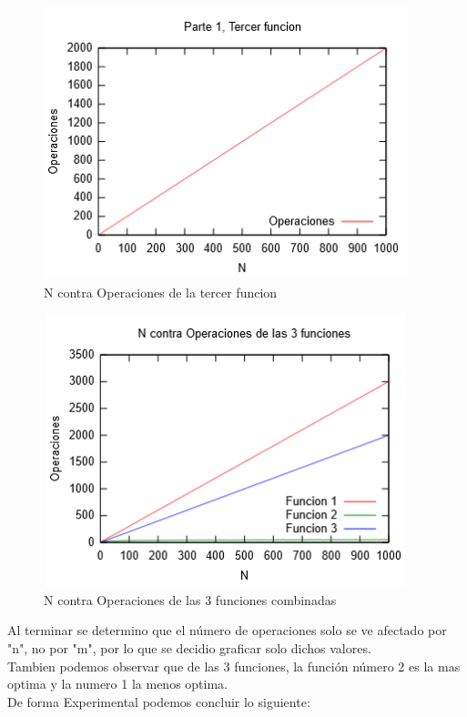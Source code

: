 \documentclass[spanish]{article}
\begin{document}
			\begin{figure}[H]
				\centering
				\includegraphics[width=400px,height=300px]{grafica3}
				\caption{N contra Operaciones de la tercer funcion}
			\end{figure}
			\begin{figure}[H]
				\centering
				\includegraphics[width=400px,height=300px]{grafica4}
				\caption{N contra Operaciones de las 3 funciones combinadas}
			\end{figure}
			Al terminar se determino que el número de operaciones solo se ve afectado por "n", no por "m", por lo que se decidio graficar solo dichos valores.\\
			Tambien podemos observar que de las 3 funciones, la función número 2 es la mas optima y la numero 1 la menos optima.\\
			De forma Experimental podemos concluir lo siguiente:
\end{document}
